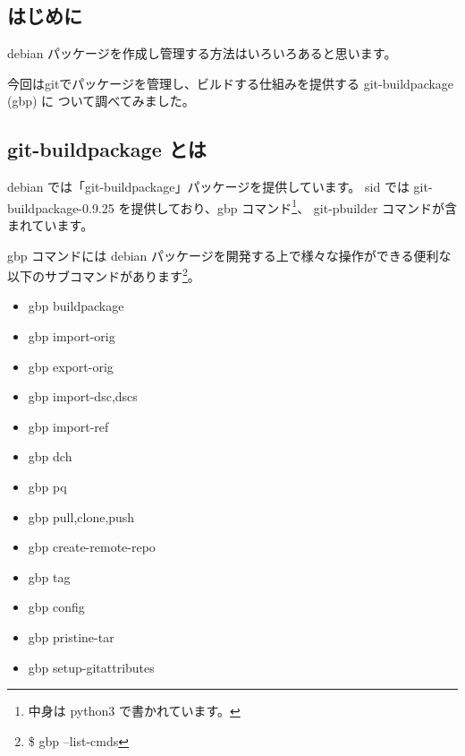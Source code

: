 \documentclass[mingoth,a4paper]{jsarticle}
\begin{document}


\subsection{はじめに}

debian パッケージを作成し管理する方法はいろいろあると思います。

今回はgitでパッケージを管理し、ビルドする仕組みを提供する git-buildpackage (gbp) に
ついて調べてみました。

\subsection{git-buildpackage とは}

debian では「git-buildpackage」パッケージを提供しています。
sid では git-buildpackage-0.9.25 を提供しており、gbp コマンド\footnote{中身は python3 で書かれています。}、
git-pbuilder コマンドが含まれています。

gbp コマンドには debian パッケージを開発する上で様々な操作ができる便利な以下のサブコマンドがあります\footnote{\$ gbp --list-cmds}。

\begin{itemize}
  \item	gbp buildpackage
  \item gbp import-orig
  \item gbp export-orig
  \item gbp import-{dsc,dscs}
  \item gbp import-ref
  \item gbp dch
  \item gbp pq
  \item gbp {pull,clone,push}
  \item gbp create-remote-repo
  \item gbp tag
  \item gbp config
  \item gbp pristine-tar
  \item gbp setup-gitattributes
\end{itemize}
\end{document}
